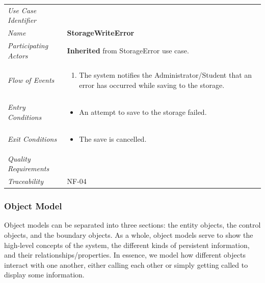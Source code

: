 \documentclass[12pt,letterpaper]{article}
\begin{document}
\begin{center}
	\begin{tabu} to 
		\toprule
		Use Case Identifier & \storagewriteerror{} \\
		Name & {\bf StorageWriteError} \\
		Participating Actors & \textbf{Inherited} from StorageError use case. \\
		Flow of Events & 
		\begin{minipage}[t]{\linewidth}
		    \begin{enumerate}
			    \item The system notifies the Administrator/Student that an error has occurred while saving to the storage.
			\end{enumerate}
		\end{minipage} \\

		Entry Conditions &
		\begin{minipage}[t]{\linewidth}
			\begin{itemize}
			    \item An attempt to save to the storage failed.
	        \end{itemize}
		\end{minipage} \\

		Exit Conditions &
		\begin{minipage}[t]{\linewidth}
			\begin{itemize}
			    \item The save is cancelled.
	        \end{itemize}
		\end{minipage} \\

		Quality Requirements & \\

		Traceability & NF-04 \\
		\toprule
	\end{tabu}
\end{center}

\subsubsection{Object Model}

Object models can be separated into three sections: the entity objects, the control objects, and the boundary objects. As a whole, object models serve to
show the high-level concepts of the system, the different kinds of persistent information, and their relationships/properties. In essence, we model how different
objects interact with one another, either calling each other or simply getting called to display some information.
\end{document}
